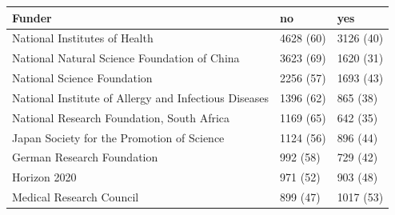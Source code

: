 \begin{table}[ht]
\centering
\begin{tabular}{lll}
 Funder & no & yes \\ 
  \hline
National Institutes of Health & 4628 (60) & 3126 (40) \\ 
  National Natural Science Foundation of China & 3623 (69) & 1620 (31) \\ 
  National Science Foundation & 2256 (57) & 1693 (43) \\ 
  National Institute of Allergy and Infectious Diseases & 1396 (62) & 865 (38) \\ 
  National Research Foundation, South Africa & 1169 (65) & 642 (35) \\ 
  Japan Society for the Promotion of Science & 1124 (56) & 896 (44) \\ 
  German Research Foundation & 992 (58) & 729 (42) \\ 
  Horizon 2020 & 971 (52) & 903 (48) \\ 
  Medical Research Council & 899 (47) & 1017 (53) \\ 
  \end{tabular}
\end{table}
